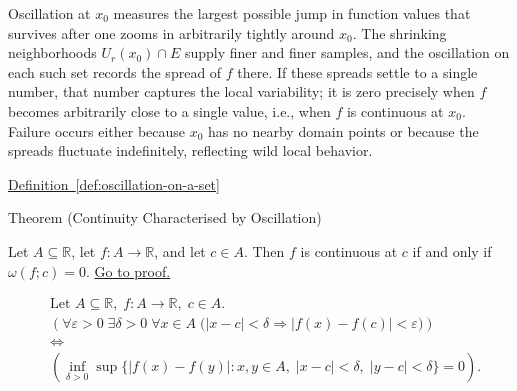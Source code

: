 \begin{remark*}[Interpretation]
Oscillation at $x_0$ measures the largest possible jump in function values that survives after one zooms in arbitrarily tightly around $x_0$. The shrinking neighborhoods $U_r(x_0)\cap E$ supply finer and finer samples, and the oscillation on each such set records the spread of $f$ there. If these spreads settle to a single number, that number captures the local variability; it is zero precisely when $f$ becomes arbitrarily close to a single value, i.e., when $f$ is continuous at $x_0$. Failure occurs either because $x_0$ has no nearby domain points or because the spreads fluctuate indefinitely, reflecting wild local behavior.
\end{remark*}

\begin{remark*}[Dependencies]
\hyperref[def:oscillation-on-a-set]{Definition~\ref*{def:oscillation-on-a-set}}
\end{remark*}


\begin{theorembox}{Theorem (Continuity Characterised by Oscillation)}
\begin{theorem}
\label{thm:continuity-iff-zero-oscillation}
Let $A \subseteq \mathbb{R}$, let $f \colon A \to \mathbb{R}$, and let $c \in A$. Then $f$ is continuous at $c$ if and only if $\omega(f;c)=0$.
\hyperref[prf:continuity-iff-zero-oscillation]{Go to proof.}
\end{theorem}
\end{theorembox}

\begin{remark*}
\[
\begin{aligned}
&\text{Let } A \subseteq \mathbb{R},\; f \colon A \to \mathbb{R},\; c \in A.\\
&\left(\forall \varepsilon>0 \; \exists \delta>0 \; \forall x \in A \; \bigl(|x-c|<\delta \Rightarrow |f(x)-f(c)|<\varepsilon\bigr)\right)\\
&\Longleftrightarrow\\
&\left(\inf_{\delta>0} \sup \bigl\{|f(x)-f(y)| : x,y \in A,\; |x-c|<\delta,\; |y-c|<\delta \bigr\} = 0\right).
\end{aligned}
\]
\end{remark*}

